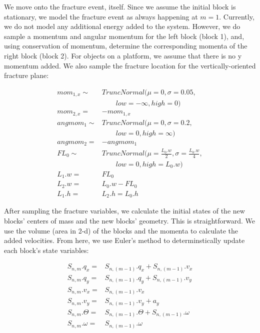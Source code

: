 \documentclass[runningheads]{llncs}
\begin{document}
We move onto the fracture event, itself. Since we assume the initial block is 
stationary, we model the fracture event as always happening at $m = 1$. Currently, we do 
not model any additional energy added to the system. However, we do sample a 
momentum and angular momentum for the left block (block 1), and, using 
conservation of momentum, determine the corresponding momenta of the right block 
(block 2). For objects on a platform, we assume that there is no y momentum 
added. We also sample the fracture location for the vertically-oriented fracture 
plane:

\begin{align*}
    mom_{1,x} \sim& TruncNormal(\mu=0, \sigma=0.05, \\
                  & \qquad low=-\infty, high=0) \\
     mom_{2,x} =& -mom_{1,x} \\
      angmom_1 \sim& TruncNormal(\mu=0, \sigma=0.2, \\ 
                   & \qquad low=0, high=\infty) \\
      angmom_2 =& -angmom_1 \\
         FL_0 \sim& TruncNormal(\mu=\frac{L_0.w}{2},\sigma=\frac{L_0.w}{4}, \\
                  & \qquad low=0,high=L_0.w) \\
         L_1.w =& FL_0 \\
         L_2.w =& L_0.w - FL_0 \\
         L_1.h =& L_2.h = L_0.h
\end{align*}

After sampling the fracture variables, we calculate the initial states of the 
new blocks' centers of mass and the new blocks' geometry. This is straightforward. We 
use the volume (area in 2-d) of the blocks and the momenta to calculate the 
added velocities. From here, we use Euler's method to determinstically update 
each block's state variables:

\begin{align*}
       S_{n,m}.q_x =& S_{n,(m-1)}.q_x + S_{n,(m-1)}.v_x \\
       S_{n,m}.q_y =& S_{n,(m-1)}.q_y + S_{n,(m-1)}.v_y \\
       S_{n,m}.v_x =& S_{n,(m-1)}.v_x \\
       S_{n,m}.v_y =& S_{n,(m-1)}.v_y + a_y \\
    S_{n,m}.\Theta =& S_{n,(m-1)}.\Theta + S_{n,(m-1)}.\omega \\
    S_{n,m}.\omega =& S_{n,(m-1)}.\omega
\end{align*}
\end{document}
